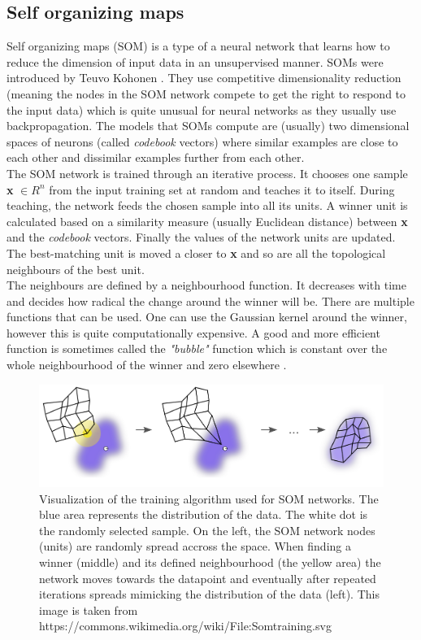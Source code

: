 \subsection{Self organizing maps}
Self organizing maps (SOM) is a type of a neural network that learns how to reduce the dimension of input data in an unsupervised manner. SOMs were introduced by Teuvo Kohonen \cite{Kohonen1982}. They use competitive dimensionality reduction (meaning the nodes in the SOM network compete to get the right to respond to the input data) which is quite unusual for neural networks as they usually use backpropagation. The models that SOMs compute are (usually) two dimensional spaces of neurons (called \textit{codebook} vectors) where similar examples are close to each other and dissimilar examples further from each other.\\
The SOM network is trained through an iterative process. It chooses one sample \textbf{x} \( \in R^n \) from the input training set at random and teaches it to itself. During teaching, the network feeds the chosen sample into all its units. A winner unit is calculated based on a similarity measure (usually Euclidean distance) between \textbf{x} and the \textit{codebook} vectors. Finally the values of the network units are updated. The best-matching unit is moved a closer to \textbf{x} and so are all the topological neighbours of the best unit.\\
The neighbours are defined by a neighbourhood function. It decreases with time and decides how radical the change around the winner will be. There are multiple functions that can be used. One can use the Gaussian kernel around the winner, however this is quite computationally expensive. A good and more efficient function is sometimes called the \textit{"bubble"} function which is constant over the whole neighbourhood of the winner and zero elsewhere \cite{SOM_training}.
\begin{figure}[h]
    \centering
	\includegraphics[width=140mm]{./img/Somtraining.png}
	\caption{Visualization of the training algorithm used for SOM networks. The blue area represents the distribution of the data. The white dot is the randomly selected sample. On the left, the SOM network nodes (units) are randomly spread accross the space. When finding a winner (middle) and its defined neighbourhood (the yellow area) the network moves towards the datapoint and eventually after repeated iterations spreads mimicking the distribution of the data (left). This image is taken from https://commons.wikimedia.org/wiki/File:Somtraining.svg}
	\label{fig:som_training}
\end{figure}



